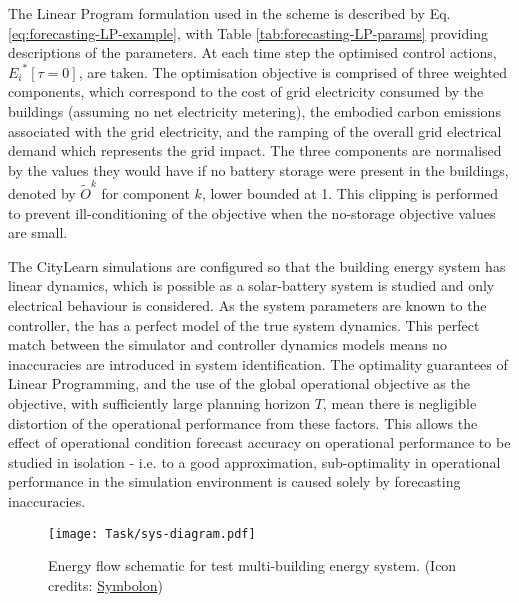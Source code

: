 \newpage
The Linear Program formulation used in the  scheme is described by Eq. \ref{eq:forecasting-LP-example}, with Table \ref{tab:forecasting-LP-params} providing descriptions of the parameters. At each time step the optimised control actions, ${E_i}^*[\tau{=}0]$, are taken. The optimisation objective is comprised of three weighted components, which correspond to the cost of grid electricity consumed by the buildings (assuming no net electricity metering), the embodied carbon emissions associated with the grid electricity, and the ramping of the overall grid electrical demand which represents the grid impact. The three components are normalised by the values they would have if no battery storage were present in the buildings, denoted by $\widetilde{O}^k$ for component $k$, lower bounded at 1. This clipping is performed to prevent ill-conditioning of the objective when the no-storage objective values are small.


The CityLearn simulations are configured so that the building energy system has linear dynamics, which is possible as a solar-battery system is studied and only electrical behaviour is considered. As the system parameters are known to the controller, the  has a perfect model of the true system dynamics. This perfect match between the simulator and controller dynamics models means no inaccuracies are introduced in system identification. The optimality guarantees of Linear Programming, and the use of the global operational objective as the  objective, with sufficiently large planning horizon $T$, mean there is negligible distortion of the operational performance from these factors. This allows the effect of operational condition forecast accuracy on  operational performance to be studied in isolation - i.e. to a good approximation, sub-optimality in operational performance in the simulation environment is caused solely by forecasting inaccuracies.\\

\begin{figure}[h]
    \centering
    \texttt{[image: Task/sys-diagram.pdf]}
    \caption{Energy flow schematic for test multi-building energy system. {\small(Icon credits: \href{https://thenounproject.com/symbolon/}{Symbolon})}}
    \label{fig:forecasting-energy-system}
\end{figure}

